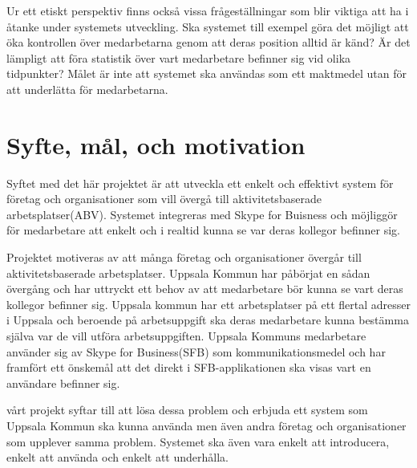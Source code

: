 \documentclass[swedish, a4paper,12pt]{article}
\begin{document}
		Ur ett etiskt perspektiv finns också vissa frågeställningar som blir viktiga att ha i åtanke under systemets utveckling. Ska systemet till exempel göra det möjligt att öka kontrollen över medarbetarna genom att deras position alltid är känd? Är det lämpligt att föra statistik över vart medarbetare befinner sig vid olika tidpunkter?
		Målet är inte att systemet ska användas som ett maktmedel utan för att underlätta för medarbetarna.






\newpage
\section{Syfte, mål, och motivation}
Syftet med det här projektet är att utveckla ett enkelt och effektivt system för företag och organisationer som vill övergå till aktivitetsbaserade arbetsplatser(ABV). Systemet integreras med Skype for Buisness och möjliggör för medarbetare att enkelt och i realtid kunna se var deras kollegor befinner sig.

Projektet motiveras av att många företag och organisationer övergår till aktivitetsbaserade arbetsplatser. Uppsala Kommun har påbörjat en sådan övergång och har uttryckt ett behov av att medarbetare bör kunna se vart deras kollegor befinner sig. Uppsala kommun har ett arbetsplatser på ett flertal adresser i Uppsala och beroende på arbetsuppgift ska deras medarbetare kunna bestämma själva var de vill utföra arbetsuppgiften. Uppsala Kommuns medarbetare använder sig av Skype for Business(SFB) som kommunikationsmedel och har framfört ett önskemål att det direkt i SFB-applikationen ska visas vart en användare befinner sig.

vårt projekt syftar till att lösa dessa problem och erbjuda ett system som Uppsala Kommun ska kunna använda men även andra företag och organisationer som upplever samma problem. Systemet ska även vara enkelt att introducera, enkelt att använda och enkelt att underhålla.
\end{document}
